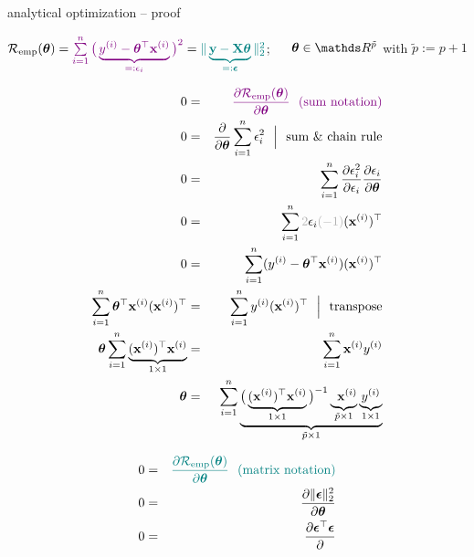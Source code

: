 \documentclass[11pt,compress,t,notes=noshow, xcolor=table]{beamer}
\begin{document}
\begin{vbframe}{analytical optimization -- proof}

\scriptsize
$\mathcal{R}_{\text{emp}}(\bm{\theta}) = \textcolor{violet}{\sum\limits_{i=1}^n \big(\underbrace{y^{(i)} - \bm{\theta}^\top \mathbf{x}^{(i)}}_{=:
\epsilon_i} \big)^2}
= \textcolor{teal}{\| \underbrace{\mathbf{y} - \mathbf{X} \bm{\theta}}_{=: \bm{\epsilon}} 
\|^2_2}$; ~~ $\thetab \in \R^{\tilde p}$ with $\tilde p := p + 1$


\begin{minipage}[t]{0.52\textwidth}
    \tiny 
    \begin{eqnarray*}
        0 &=& \textcolor{violet}{\frac{\partial \risket}{\partial \thetab}
        ~~ \text{(sum notation)}} \\
        0 &=& \frac{\partial}{\partial \thetab} \sumin \epsilon_i^2 
        ~~ \Big \rvert
        ~~ \text{sum \& chain rule} \\
        0 &=& \sumin \frac{\partial \epsilon_i^2}{\partial \epsilon_i}
        \frac{\partial \epsilon_i}{\partial \thetab} \\
        0 &=& \sumin \textcolor{black!30}{2} \epsilon_i 
        \textcolor{black!30}{(-1)} (\xi)^\top \\ 
        0 &=& \sumin (\yi - \thetab^\top \xi)(\xi)^\top \\
        \sumin \thetab^\top \xi (\xi)^\top &=&\sumin \yi (\xi)^\top 
        ~~ \Big \rvert ~~ \text{transpose} \\
        \thetab \sumin \underbrace{(\xi)^\top \xi}_{1 \times 1} &=& 
        \sumin \xi \yi \\
        \thetab &=& \sumin \underbrace{
        \big( \underbrace{(\xi)^\top \xi}_{1 \times 1}  \big)^{-1}
        \underbrace{\phantom{y}\xi}_{\tilde p \times 1} \underbrace{\yi}_
        {1 \times 1}}_{\tilde p \times 1}
    \end{eqnarray*}
\end{minipage}
\hfill
\begin{minipage}[t]{0.45\textwidth}
    \tiny 
    \begin{eqnarray*}
        0 &=& \textcolor{teal}{\frac{\partial \mathcal{R}_{\text{emp}}(\bm{\theta})}{\partial \bm{\theta}}
        ~~ \text{(matrix notation)}} \\
        0 &=& \frac{\partial \| \bm{\epsilon} \|_2^2 }{\partial \bm{\theta}} \\
        0 &=& \frac{\partial \bm{\epsilon}^\top \bm{\epsilon} }{\partial 
}
\end{eqnarray*}
\end{minipage}
\end{vbframe}
\end{document}
